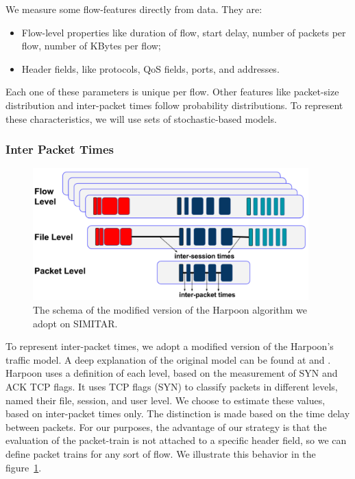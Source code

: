 We measure some flow-features directly from data. They are:  

\begin{itemize}
\item Flow-level properties like duration of flow, start delay, number of packets per flow, number of KBytes per flow; 
\item Header fields, like protocols, QoS fields, ports, and addresses.
\end{itemize}

Each one of these parameters is unique per flow. Other features like packet-size distribution and inter-packet times follow probability distributions.  To represent these characteristics, we will use sets of stochastic-based models.  


\subsubsection{Inter Packet Times}

\begin{figure}[ht!]
    \centering
    \includegraphics[height=2.0in]{figures/ch3/modified-harpoon-model}
    \caption{The schema of the modified version of the Harpoon algorithm we adopt on SIMITAR.}
    \label{fig:modified-harpoon-model}
\end{figure}


To represent inter-packet times, we adopt a modified version of the Harpoon's traffic model. A deep explanation of the original model can be found at \cite{harpoon-paper} and \cite{harpoon-validation}. Harpoon uses a definition of each level, based on the measurement of SYN and ACK TCP flags. It uses TCP flags (SYN) to classify packets in different levels, named their file, session, and user level. We choose to estimate these values, based on inter-packet times only. The distinction is made based on the time delay between packets. For our purposes, the advantage of our strategy is that the evaluation of the packet-train is not attached to a specific header field, so we can define packet trains for any sort of flow. We illustrate this behavior in the figure~\ref{fig:modified-harpoon-model}.


